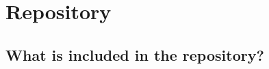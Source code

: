 \chapter{Repository}
\label{chapter: repository}
\setlength{\parskip}{12pt}



\section{What is included in the repository?}



